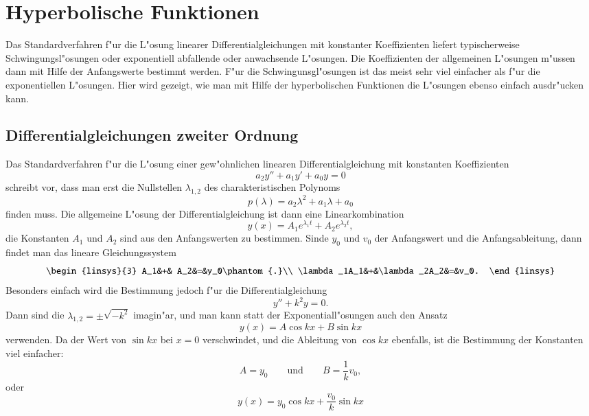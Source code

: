 %
%
%
\chapter{Hyperbolische Funktionen}
Das Standardverfahren f"ur die L"osung linearer Differentialgleichungen
mit konstanter Koeffizienten liefert typischerweise Schwingungsl"osungen
oder exponentiell abfallende oder anwachsende L"osungen. Die Koeffizienten
der allgemeinen L"osungen m"ussen dann mit Hilfe der Anfangswerte bestimmt
werden. F"ur die Schwingunsgl"osungen ist das meist sehr viel einfacher
als f"ur die exponentiellen L"osungen. Hier wird gezeigt, wie man mit
Hilfe der hyperbolischen Funktionen die L"osungen ebenso einfach ausdr"ucken
kann.

\section{Differentialgleichungen zweiter Ordnung}
Das Standardverfahren f"ur die L"osung einer gew"ohnlichen linearen
Differentialgleichung mit konstanten Koeffizienten
\[
a_2y''+ a_1y'+a_0y=0
\]
schreibt vor, dass man erst die Nullstellen $\lambda_{1,2}$
des charakteristischen Polynoms
\[
p(\lambda)=a_2\lambda^2+a_1\lambda+a_0
\]
finden muss.
Die allgemeine L"osung der Differentialgleichung ist dann
eine Linearkombination
\[
y(x)=
A_1 e^{\lambda_1t}
+
A_2 e^{\lambda_2t},
\]
die Konstanten $A_1$ und $A_2$ sind aus den Anfangswerten zu bestimmen.
Sinde $y_0$ und $v_0$ der Anfangswert und die Anfangsableitung, dann
findet man das lineare Gleichungssystem
\[
\begin{linsys}{3}
         A_1&+&         A_2&=&y_0\phantom{.}\\
\lambda_1A_1&+&\lambda_2A_2&=&v_0.
\end{linsys}
\]
Besonders einfach wird die Bestimmung jedoch f"ur die Differentialgleichung
\[
y''+k^2 y=0.
\]
Dann sind die $\lambda_{1,2}=\pm\sqrt{-k^2}$ imagin"ar, und man kann statt
der Exponentiall"osungen auch den Ansatz
\[
y(x)=A\cos kx+B\sin kx
\]
verwenden.
Da der Wert von $\sin kx$ bei $x=0$ verschwindet, und die Ableitung von
$\cos kx$ ebenfalls, ist die Bestimmung der Konstanten viel einfacher:
\[
A=y_0
\qquad\text{und}\qquad
B=\frac1kv_0,
\]
oder
\begin{equation}
y(x)=y_0\cos kx + \frac{v_0}{k}\sin kx
\label{hyp:loesung}
\end{equation}

